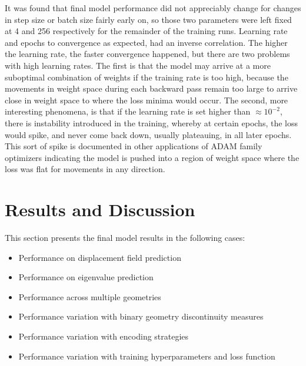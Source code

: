 \documentclass[preprint,review,12pt]{elsarticle}
\newcommand{\checked}{\ding{51}}    %
\newcommand{\unchecked}{\ding{55}}  %
\begin{document}
It was found that final model performance did not appreciably change for changes in step size or batch size fairly early on, so those two parameters were left fixed at 4 and 256 respectively for the remainder of the training runs. Learning rate and epochs to convergence as expected, had an inverse correlation. The higher the learning rate, the faster convergence happened, but there are two problems with high learning rates. The first is that the model may arrive at a more suboptimal combination of weights if the training rate is too high, because the movements in weight space during each backward pass remain too large to arrive close in weight space to where the loss minima would occur. The second, more interesting phenomena, is that if the learning rate is set higher than $\approx 10^{-2}$, there is instability introduced in the training, whereby at certain epochs, the loss would spike, and never come back down, usually plateauing, in all later epochs. This sort of spike is documented in other applications of ADAM family optimizers indicating the model is pushed into a region of weight space where the loss was flat for movements in any direction.

\section{Results and Discussion}
This section presents the final model results in the following cases:
\begin{itemize}
    \item[\checked] Performance on displacement field prediction
    \item[\checked] Performance on eigenvalue prediction
    \item[\checked] Performance across multiple geometries
    \item[\checked] Performance variation with binary geometry discontinuity measures
    \item[\unchecked] Performance variation with encoding strategies
    \item[\unchecked] Performance variation with training hyperparameters and loss function
\end{itemize}

\end{document}
